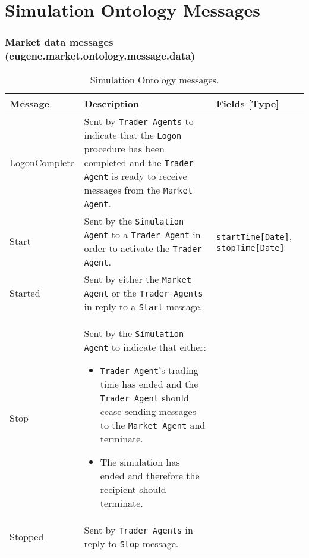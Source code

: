\chapter{Simulation Ontology Messages}
\label{Appendix/Simulation-Ontology}

\subsection{Market data messages (eugene.market.ontology.message.data)}
\begin{table}[ht]
\begin{center}
\begin{tabular}{l p{3in} p{1.5in}}

\multicolumn{1}{l}{\textbf{Message}}  	    &
\multicolumn{1}{l}{\textbf{Description}}    & 
\multicolumn{1}{l}{\textbf{Fields [Type]}}	\\              
\toprule

LogonComplete & Sent by \texttt{Trader Agents} to indicate that the \texttt{Logon} procedure has been completed and the \texttt{Trader Agent} is ready to receive messages from the \texttt{Market Agent}. &   \\

Start & Sent by the \texttt{Simulation Agent} to a \texttt{Trader Agent} in order to activate the \texttt{Trader Agent}. 
& \texttt{startTime[Date]}, \texttt{stopTime[Date]} \\

Started & Sent by either the \texttt{Market Agent} or the \texttt{Trader Agents} in reply to a \texttt{Start} message. & \\

Stop	& Sent by the \texttt{Simulation Agent} to indicate that either:
\begin{itemize}
\item \texttt{Trader Agent}'s trading time has ended and the \texttt{Trader Agent} should cease sending messages to the \texttt{Market Agent} and terminate.
\item The simulation has ended and therefore the recipient should terminate.
\end{itemize}	& \\

Stopped	& Sent by \texttt{Trader Agents} in reply to \texttt{Stop} message. & \\

\end{tabular}
\end{center}
\caption{Simulation Ontology messages.}        
\end{table}